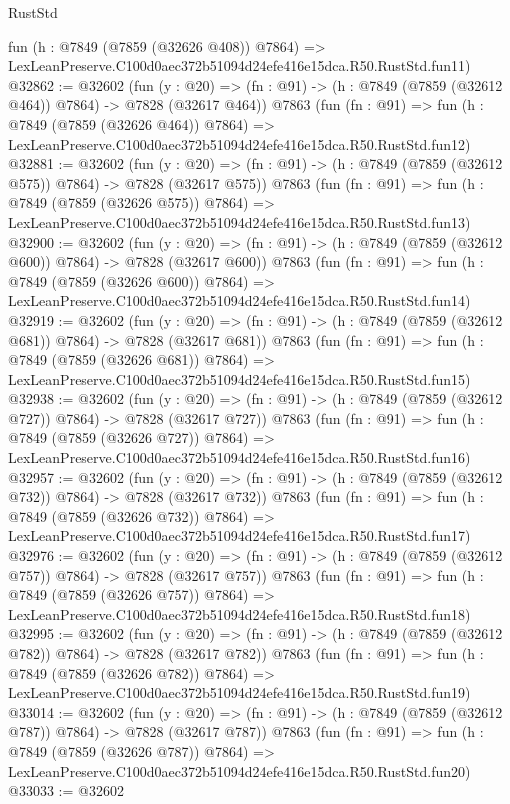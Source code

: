\begin{lexlean}{RustStd}
\begin{coremodule}
    fun (h : @7849 (@7859 (@32626 @408)) @7864) =>
    LexLeanPreserve.C100d0aec372b51094d24efe416e15dca.R50.RustStd.fun11)
@32862 := @32602
    (fun (y : @20) => (fn : @91) -> (h : @7849 (@7859 (@32612 @464)) @7864) -> @7828 (@32617 @464))
    @7863
    (fun (fn : @91) =>
    fun (h : @7849 (@7859 (@32626 @464)) @7864) =>
    LexLeanPreserve.C100d0aec372b51094d24efe416e15dca.R50.RustStd.fun12)
@32881 := @32602
    (fun (y : @20) => (fn : @91) -> (h : @7849 (@7859 (@32612 @575)) @7864) -> @7828 (@32617 @575))
    @7863
    (fun (fn : @91) =>
    fun (h : @7849 (@7859 (@32626 @575)) @7864) =>
    LexLeanPreserve.C100d0aec372b51094d24efe416e15dca.R50.RustStd.fun13)
@32900 := @32602
    (fun (y : @20) => (fn : @91) -> (h : @7849 (@7859 (@32612 @600)) @7864) -> @7828 (@32617 @600))
    @7863
    (fun (fn : @91) =>
    fun (h : @7849 (@7859 (@32626 @600)) @7864) =>
    LexLeanPreserve.C100d0aec372b51094d24efe416e15dca.R50.RustStd.fun14)
@32919 := @32602
    (fun (y : @20) => (fn : @91) -> (h : @7849 (@7859 (@32612 @681)) @7864) -> @7828 (@32617 @681))
    @7863
    (fun (fn : @91) =>
    fun (h : @7849 (@7859 (@32626 @681)) @7864) =>
    LexLeanPreserve.C100d0aec372b51094d24efe416e15dca.R50.RustStd.fun15)
@32938 := @32602
    (fun (y : @20) => (fn : @91) -> (h : @7849 (@7859 (@32612 @727)) @7864) -> @7828 (@32617 @727))
    @7863
    (fun (fn : @91) =>
    fun (h : @7849 (@7859 (@32626 @727)) @7864) =>
    LexLeanPreserve.C100d0aec372b51094d24efe416e15dca.R50.RustStd.fun16)
@32957 := @32602
    (fun (y : @20) => (fn : @91) -> (h : @7849 (@7859 (@32612 @732)) @7864) -> @7828 (@32617 @732))
    @7863
    (fun (fn : @91) =>
    fun (h : @7849 (@7859 (@32626 @732)) @7864) =>
    LexLeanPreserve.C100d0aec372b51094d24efe416e15dca.R50.RustStd.fun17)
@32976 := @32602
    (fun (y : @20) => (fn : @91) -> (h : @7849 (@7859 (@32612 @757)) @7864) -> @7828 (@32617 @757))
    @7863
    (fun (fn : @91) =>
    fun (h : @7849 (@7859 (@32626 @757)) @7864) =>
    LexLeanPreserve.C100d0aec372b51094d24efe416e15dca.R50.RustStd.fun18)
@32995 := @32602
    (fun (y : @20) => (fn : @91) -> (h : @7849 (@7859 (@32612 @782)) @7864) -> @7828 (@32617 @782))
    @7863
    (fun (fn : @91) =>
    fun (h : @7849 (@7859 (@32626 @782)) @7864) =>
    LexLeanPreserve.C100d0aec372b51094d24efe416e15dca.R50.RustStd.fun19)
@33014 := @32602
    (fun (y : @20) => (fn : @91) -> (h : @7849 (@7859 (@32612 @787)) @7864) -> @7828 (@32617 @787))
    @7863
    (fun (fn : @91) =>
    fun (h : @7849 (@7859 (@32626 @787)) @7864) =>
    LexLeanPreserve.C100d0aec372b51094d24efe416e15dca.R50.RustStd.fun20)
@33033 := @32602

\end{coremodule}
\end{lexlean}
